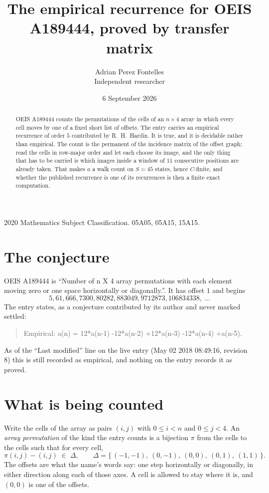 \documentclass[11pt,a4paper]{article}
\title{The empirical recurrence for OEIS A189444, proved by transfer matrix}
\author{Adrian Perez Fontelles\\ \small Independent researcher}
\date{6 September 2026}
\theoremstyle{plain}
\theoremstyle{definition}
\begin{document}
\maketitle

\begin{abstract}
OEIS A189444 counts the permutations of the cells of an $n\times4$ array in which every cell
moves by one of a fixed short list of offsets. The entry carries an empirical recurrence of
order $5$ contributed by R.~H.~Hardin. It is true, and it is decidable rather than
empirical. The count is the permanent of the incidence matrix of the offset graph; read the
cells in row-major order and let each choose its image, and the only thing that has to be
carried is which images inside a window of $11$ consecutive positions are already taken.
That makes $a$ a walk count on $S=45$ states, hence $C$-finite, and whether the published
recurrence is one of its recurrences is then a finite exact computation.
\end{abstract}

\noindent\small 2020 Mathematics Subject Classification. 05A05, 05A15, 15A15.\normalsize

\section{The conjecture}

OEIS A189444 is ``Number of n X 4 array permutations with each element moving zero or one space horizontally or diagonally.''. It has offset $1$ and begins
\[
5, 61, 666, 7300, 80282, 883049, 9712873, 106834338,\ \dots
\]
The entry states, as a conjecture contributed by its author and never marked settled:
\begin{quote}
Empirical: a(n) = 12*a(n-1) -12*a(n-2) +12*a(n-3) -12*a(n-4) +a(n-5).
\end{quote}
As of the ``Last modified'' line on the live entry (May 02 2018 08:49:16, revision 8) this is still
recorded as empirical, and nothing on the entry records it as proved.

\section{What is being counted}

Write the cells of the array as pairs $(i,j)$ with $0\le i<n$ and $0\le j<4$. An
\emph{array permutation} of the kind the entry counts is a bijection $\pi$ from the cells to
the cells such that for every cell,
\[
\pi(i,j)-(i,j)\;\in\;\Delta,\qquad
\Delta=\{\,(-1,-1),\ (0,-1),\ (0,0),\ (0,1),\ (1,1)\,\}.
\]
The offsets are what the name's words say: one step horizontally or diagonally, in either direction along each of those axes. A cell is allowed to stay where it is, and $(0,0)$ is one of the offsets.
\end{document}

